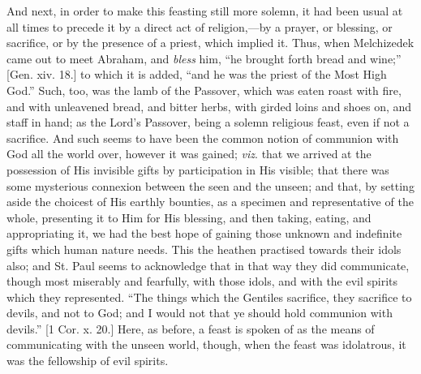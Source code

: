 And next, in order to make this feasting still more solemn, it had
been usual at all times to precede it by a direct act of religion,—by
a prayer, or blessing, or sacrifice, or by the presence of a priest,
which implied it. Thus, when Melchizedek came out to meet Abraham, and
\emph{bless} him, ``he brought forth bread and wine;'' [Gen.
xiv. 18.] to which it is added, ``and he was the priest of the
Most High God.'' Such, too, was the lamb of the Passover, which
was eaten roast with fire, and with unleavened bread, and bitter
herbs, with girded loins and shoes on, and staff in hand; as the
Lord's Passover, being a solemn religious feast, even if not a
sacrifice. And such seems to have been the common notion of communion
with God all the world over, however it was gained; \emph{viz}. that we
arrived at the possession of His invisible gifts by participation in
His visible; that there was some mysterious connexion between the seen
and the unseen; and that, by setting aside the choicest of His earthly
bounties, as a specimen and representative of the whole, presenting it
to Him for His blessing, and then taking, eating, and appropriating
it, we had the best hope of gaining those unknown and indefinite gifts
which human nature needs. This the heathen practised towards their
idols also; and St. Paul seems to acknowledge that in that way they
did communicate, though most miserably and fearfully, with those
idols, and with the evil spirits which they represented. ``The
things which the Gentiles sacrifice, they sacrifice to devils, and not
to God; and I would not that ye should hold communion with
devils.'' [1 Cor. x. 20.] Here, as before, a feast is spoken of as
the means of communicating with the unseen world, though, when the
feast was idolatrous, it was the fellowship of evil spirits.

